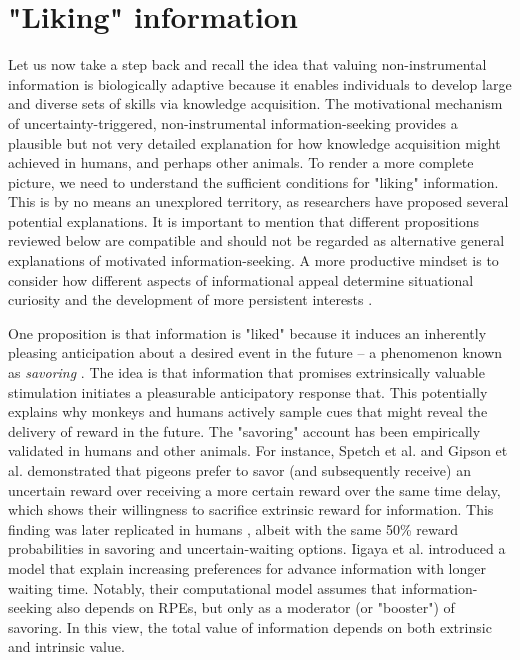\section{"Liking" information}\label{sec:liking_information}

Let us now take a step back and recall the idea that valuing non-instrumental information is biologically adaptive because it enables individuals to develop large and diverse sets of skills via knowledge acquisition. The motivational mechanism of uncertainty-triggered, non-instrumental information-seeking provides a plausible but not very detailed explanation for how knowledge acquisition might achieved in humans, and perhaps other animals. To render a more complete picture, we need to understand the sufficient conditions for "liking" information. This is by no means an unexplored territory, as researchers have proposed several potential explanations. It is important to mention that different propositions reviewed below are compatible and should not be regarded as alternative general explanations of motivated information-seeking. A more productive mindset is to consider how different aspects of informational appeal determine situational curiosity and the development of more persistent interests \cite{kobayashi_diverse_2019,bromberg-martin_value_2020,fitzgibbon_lure_2021}.

One proposition is that information is "liked" because it induces an inherently pleasing anticipation about a desired event in the future -- a phenomenon known as \emph{savoring} \cite{loewenstein_anticipation_1987}. The idea is that information that promises extrinsically valuable stimulation initiates a pleasurable anticipatory response that. This potentially explains why monkeys \cite{bromberg-martin_midbrain_2009,bromberg-martin_lateral_2011} and humans \cite{van_lieshout_induction_2018,kobayashi_diverse_2019} actively sample cues that might reveal the delivery of reward in the future. The "savoring" account has been empirically validated in humans and other animals. For instance, Spetch et al. \cite{spetch_suboptimal_1990} and Gipson et al. \cite{gipson_preference_2009} demonstrated that pigeons prefer to savor (and subsequently receive) an uncertain reward over receiving a more certain \cite[up to 100\% certain in][]{spetch_suboptimal_1990} reward over the same time delay, which shows their willingness to sacrifice extrinsic reward for information. This finding was later replicated in humans \cite{iigaya_modulation_2016}, albeit with the same 50\% reward probabilities in savoring and uncertain-waiting options. Iigaya et al. \cite{iigaya_modulation_2016} introduced a model that explain increasing preferences for advance information with longer waiting time. Notably, their computational model assumes that information-seeking also depends on \acp{RPE}, but only as a moderator (or "booster") of savoring. In this view, the total value of information depends on both extrinsic and intrinsic value.

